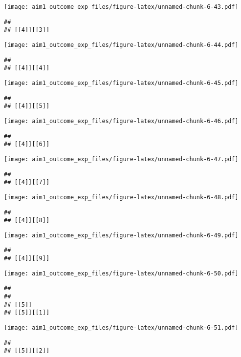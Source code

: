 \documentclass[
]{article}
\begin{document}
\texttt{[image: aim1\_outcome\_exp\_files/figure-latex/unnamed-chunk-6-43.pdf]}

\begin{verbatim}
## 
## [[4]][[3]]
\end{verbatim}

\texttt{[image: aim1\_outcome\_exp\_files/figure-latex/unnamed-chunk-6-44.pdf]}

\begin{verbatim}
## 
## [[4]][[4]]
\end{verbatim}

\texttt{[image: aim1\_outcome\_exp\_files/figure-latex/unnamed-chunk-6-45.pdf]}

\begin{verbatim}
## 
## [[4]][[5]]
\end{verbatim}

\texttt{[image: aim1\_outcome\_exp\_files/figure-latex/unnamed-chunk-6-46.pdf]}

\begin{verbatim}
## 
## [[4]][[6]]
\end{verbatim}

\texttt{[image: aim1\_outcome\_exp\_files/figure-latex/unnamed-chunk-6-47.pdf]}

\begin{verbatim}
## 
## [[4]][[7]]
\end{verbatim}

\texttt{[image: aim1\_outcome\_exp\_files/figure-latex/unnamed-chunk-6-48.pdf]}

\begin{verbatim}
## 
## [[4]][[8]]
\end{verbatim}

\texttt{[image: aim1\_outcome\_exp\_files/figure-latex/unnamed-chunk-6-49.pdf]}

\begin{verbatim}
## 
## [[4]][[9]]
\end{verbatim}

\texttt{[image: aim1\_outcome\_exp\_files/figure-latex/unnamed-chunk-6-50.pdf]}

\begin{verbatim}
## 
## 
## [[5]]
## [[5]][[1]]
\end{verbatim}

\texttt{[image: aim1\_outcome\_exp\_files/figure-latex/unnamed-chunk-6-51.pdf]}

\begin{verbatim}
## 
## [[5]][[2]]
\end{verbatim}
\end{document}
